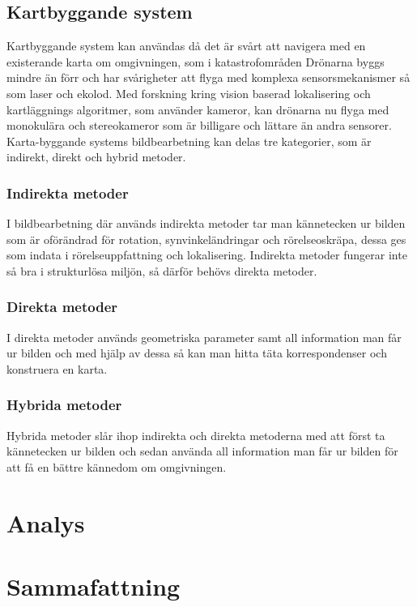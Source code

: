 \section{Kartbyggande system}

Kartbyggande system kan användas då det är svårt att navigera med en existerande karta om omgivningen, som i katastrofområden \citep{geospatial} Drönarna byggs mindre än förr och har svårigheter att flyga med komplexa sensorsmekanismer så som laser och ekolod. Med forskning kring vision baserad lokalisering och kartläggnings algoritmer, som använder kameror, kan drönarna nu flyga med monokulära och stereokameror som är billigare och lättare än andra sensorer. Karta-byggande systems bildbearbetning kan delas tre kategorier, som är indirekt, direkt och hybrid metoder.

\subsection{Indirekta metoder}

I bildbearbetning där används indirekta metoder tar man kännetecken ur bilden som är
oförändrad för rotation, synvinkeländringar och rörelseoskräpa, dessa ges som indata i
rörelseuppfattning och lokalisering. Indirekta metoder fungerar inte så bra i strukturlösa
miljön, så därför behövs direkta metoder. 

\subsection{Direkta metoder}

I direkta metoder används geometriska parameter samt all information man får ur bilden och med hjälp av dessa så kan man hitta täta
korrespondenser och konstruera en karta. 

\subsection{Hybrida metoder}
Hybrida metoder slår ihop indirekta och direkta metoderna med att först ta kännetecken ur bilden och sedan använda all information man får
ur bilden för att få en bättre kännedom om omgivningen.

\chapter{Analys}

\chapter{Sammafattning}

